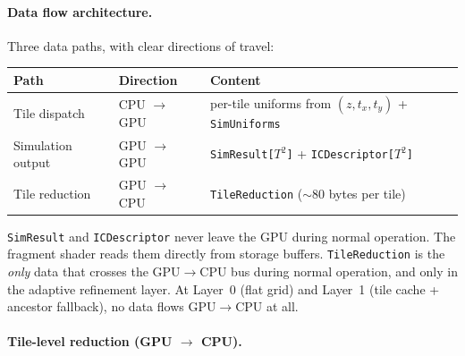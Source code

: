 \documentclass[11pt]{report}
\begin{document}

\paragraph{Data flow architecture.}

Three data paths, with clear directions of travel:
\begin{center}
\begin{tabular}{lll}
\toprule
Path & Direction & Content \\
\midrule
Tile dispatch & CPU $\to$ GPU & per-tile uniforms from $(z, t_x, t_y)$ + \texttt{SimUniforms} \\
Simulation output & GPU $\to$ GPU & \texttt{SimResult[$T^2$]} + \texttt{ICDescriptor[$T^2$]} \\
Tile reduction & GPU $\to$ CPU & \texttt{TileReduction} ($\sim$80 bytes per tile) \\
\bottomrule
\end{tabular}
\end{center}

\texttt{SimResult} and \texttt{ICDescriptor} never leave the GPU during normal operation. The fragment shader reads them directly from storage buffers. \texttt{TileReduction} is the \emph{only} data that crosses the GPU$\to$CPU bus during normal operation, and only in the adaptive refinement layer. At Layer~0 (flat grid) and Layer~1 (tile cache + ancestor fallback), no data flows GPU$\to$CPU at all.


\paragraph{Tile-level reduction (GPU $\to$ CPU).}
\label{par:tile_reduction}
\end{document}
